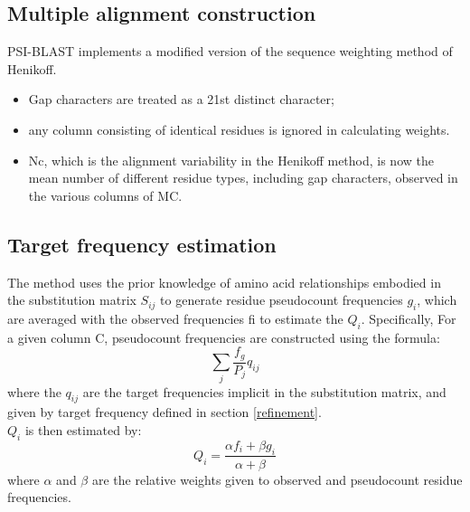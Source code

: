         \subsection{Multiple alignment construction}
        PSI-BLAST implements a modified version of the sequence weighting method of Henikoff.
        \begin{itemize}
            \item Gap characters are treated as a 21st distinct character;
            \item any column consisting of identical residues is ignored in calculating weights.
            \item N{c}, which is the alignment variability in the Henikoff method, is now the mean number of different residue types, including gap characters, observed in the various columns of M{C}.
        \end{itemize}

    \subsection{Target frequency estimation}
    The method uses the prior knowledge of amino acid relationships embodied in the substitution matrix $S_{ij}$ to generate residue pseudocount frequencies $g_i$, which are averaged with the observed frequencies f{i} to estimate the $Q_i$.
    Specifically,
    For a given column C, pseudocount frequencies are constructed using the formula:
    $$ \sum_{j} \frac{f_g}{P_j} q_{ij} $$
    where the $q_{ij}$ are the target frequencies implicit in the substitution matrix, and given by target frequency defined in section \ref{refinement}. \\
    $Q_i$ is then estimated by:
    $$ Q_i = \frac{\alpha f_i + \beta g_i }{\alpha + \beta}$$ where $\alpha$ and $\beta$ are the relative weights given to observed and
    pseudocount residue frequencies.
